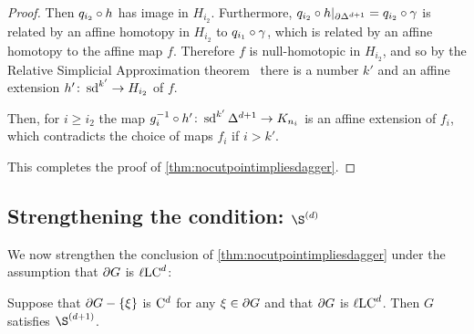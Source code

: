 \documentclass[a4paper]{article}
\begin{document}
\begin{proof}
Then $q_{i_2}\circ h$ has image in $H_{i_2}$. Furthermore,
$q_{i_2}\circ h\vert_{\partial\Delta^{d+1}} = q_{i_2}\circ
\gamma$ is related by an affine homotopy in $H_{i_2}$ to
$q_{i_1}\circ\gamma$, which is related by an affine homotopy to the affine
map $f$. Therefore $f$ is null-homotopic in $H_{i_2}$, and so by the Relative
Simplicial Approximation theorem~\cite{zeeman64} there is a number $k'$ and an
affine extension $h'\colon\operatorname{sd}^{k'}\to H_{i_2}$ of $f$.

Then, for $i \geq i_2$ the map $g_i^{-1}\circ
h'\colon\operatorname{sd}^{k'}\Delta^{d+1}\to K_{n_i}$ is an affine extension of $f_i$, which
contradicts the choice of maps $f_i$ if $i > k'$.

This completes the proof of \cref{thm:nocutpointimpliesdagger}.
\end{proof}

\subsection{Strengthening the condition: $\Sd{d}$}

We now strengthen the conclusion of \cref{thm:nocutpointimpliesdagger} 
under the assumption that $\partial G$ is $\ell\mathrm{LC}^{d}$:

\begin{theorem}\label{thm:lLCandnocutpointimpliesS}
  Suppose that $\partial G - \left\{\xi\right\}$ is $\mathrm{C}^{d}$ for any $\xi \in \partial G$ 
  and that $\partial G$ is $\ell\mathrm{LC}^{d}$. Then $G$ satisfies $\Sd{d+1}$.
\end{theorem}
\end{document}
